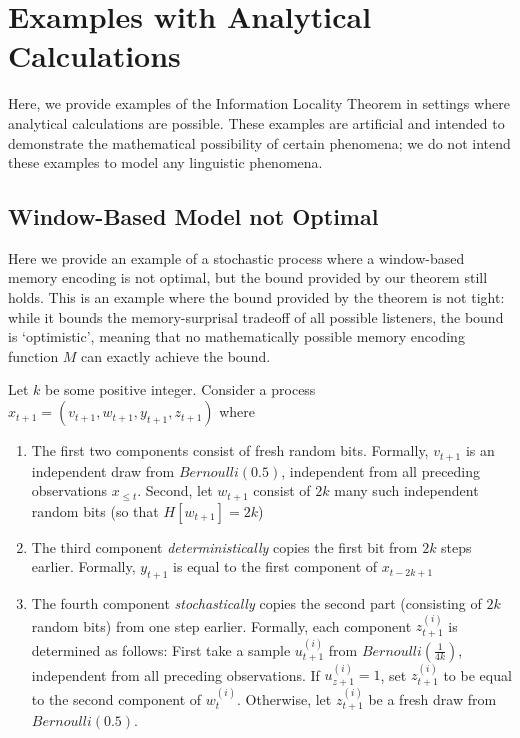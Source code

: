 \documentclass[11pt,letterpaper]{article}
\newcounter{theorem}
\begin{document}
\section{Examples with Analytical Calculations}

Here, we provide examples of the Information Locality Theorem in settings where analytical calculations are possible.
These examples are artificial and intended to demonstrate the mathematical possibility of certain phenomena; we do not intend these examples to model any linguistic phenomena.


%
%

\subsection{Window-Based Model not Optimal}

Here we provide an example of a stochastic process where a window-based memory encoding is not optimal, but the bound provided by our theorem still holds.
This is an example where the bound provided by the theorem is not tight: while it bounds the memory-surprisal tradeoff of all possible listeners, the bound is `optimistic', meaning that no mathematically possible memory encoding function $M$ can exactly achieve the bound.

Let $k$ be some positive integer.
Consider a process
$x_{t+1} = (v_{t+1}, w_{t+1}, y_{t+1}, z_{t+1})$
where
\begin{enumerate}
	\item The first two components consist of fresh random bits. Formally, $v_{t+1}$ is an independent draw from $Bernoulli(0.5)$, independent from all preceding observations $x_{\leq t}$.
		Second, let $w_{t+1}$ consist of $2k$ many such independent random bits (so that $H[w_{t+1}] = 2k$)
	\item The third component \emph{deterministically} copies the first bit from $2k$ steps earlier. Formally, $y_{t+1}$ is equal to the first component of $x_{t-2k+1}$
	\item The fourth component \emph{stochastically} copies the second part (consisting of $2k$ random bits) from one step earlier. Formally, each component $z_{t+1}^{(i)}$ is determined as follows: First take a sample $u_{t+1}^{(i)}$ from $Bernoulli(\frac{1}{4k})$, independent from all preceding observations.
		If $u_{z+1}^{(i)}=1$, set $z_{t+1}^{(i)}$ to be equal to the second component of $w_{t}^{(i)}$.
		Otherwise, let $z_{t+1}^{(i)}$ be a fresh draw from $Bernoulli(0.5)$.
\end{enumerate}
\end{document}
